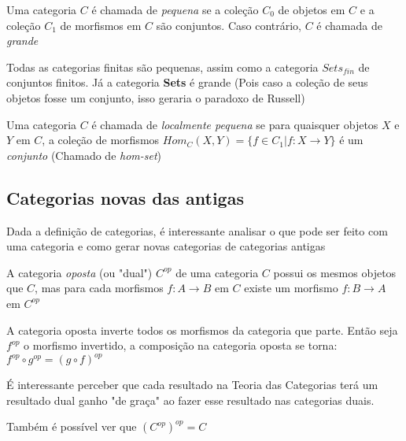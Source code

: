 \documentclass[../main.tex]{subfiles}
\begin{document}
\begin{definition}
    Uma categoria $C$ é chamada de \emph{pequena} se a coleção $C_0$ de objetos em $C$ e a coleção $C_1$ de morfismos em $C$ são conjuntos. Caso contrário, $C$ é chamada de \emph{grande}
\end{definition}

Todas as categorias finitas são pequenas, assim como a categoria \textbf{$Sets_{fin}$} de conjuntos finitos. Já a categoria \textbf{Sets} é grande (Pois caso a coleção de seus objetos fosse um conjunto, isso geraria o paradoxo de Russell)

\begin{definition}
    Uma categoria $C$ é chamada de \emph{localmente pequena} se para quaisquer objetos $X$ e $Y$ em $C$, a coleção de morfismos $Hom_C(X, Y) = \{f \in C_1 | f : X \to Y\}$ é um \emph{conjunto} (Chamado de \emph{hom-set})
\end{definition}

\subsection{Categorias novas das antigas}

Dada a definição de categorias, é interessante analisar o que pode ser feito com uma categoria e como gerar novas categorias de categorias antigas

\begin{definition}
    A categoria \emph{oposta} (ou "dual") $C^{op}$ de uma categoria $C$ possui os mesmos objetos que $C$, mas para cada morfismos $f : A \to B$ em $C$ existe um morfismo $f : B \to A$ em $C^{op}$
\end{definition}

A categoria oposta inverte todos os morfismos da categoria que parte. Então seja $f^{op}$ o morfismo invertido, a composição na categoria oposta se torna: $f^{op} \circ g^{op} = (g \circ f)^{op}$

É interessante perceber que cada resultado na Teoria das Categorias terá um resultado dual ganho "de graça" ao fazer esse resultado nas categorias duais.

Também é possível ver que $(C^{op})^{op} = C$
\end{document}
